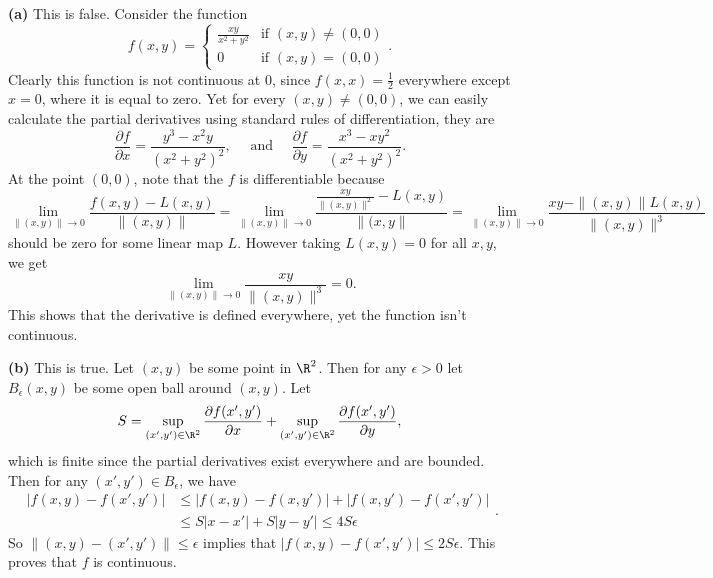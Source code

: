 \documentclass[11pt,letterpaper]{article}
\begin{document}
\begin{solution}
    \textbf{(a)} This is false. Consider the function
    \[
        f(x,y) = \begin{cases}
            \displaystyle\frac{xy}{x^2+y^2}&\textrm{if }(x,y)\neq (0,0)\\
            0&\textrm{if }(x,y)=(0,0)
        \end{cases}
    .\] 
    Clearly this function is not continuous at $0$, since $f(x,x)=\frac{1}{2}$ everywhere except $x=0$, where it is equal to zero. Yet for every $(x,y)\neq (0,0)$, we can easily calculate the partial derivatives using standard rules of differentiation, they are
    \[
        \frac{\partial f}{\partial x} = \frac{y^3-x^2y}{(x^2+y^2)^2},\quad\textrm{ and }\quad \frac{\partial f}{\partial y}=\frac{x^3-xy^2}{(x^2+y^2)^2}
    .\]
    At the point $(0,0)$, note that the $f$ is differentiable because 
    \[
        \lim_{\|(x,y)\|\to 0}\frac{f(x,y)-L(x,y)}{\|(x,y)\|}=\lim_{\|(x,y)\|\to 0}\frac{\displaystyle\frac{xy}{\|(x,y)\|^2}-L(x,y)}{\|(x,y\|}=\lim_{\|(x,y)\|\to 0}\frac{xy-\|(x,y)\|L(x,y)}{\|(x,y)\|^3}
    \]
    should be zero for some linear map $L$. However taking $L(x,y)=0$ for all $x,y$, we get
    \[
        \lim_{\|(x,y)\|\to 0} \frac{xy}{\|(x,y)\|^3}=0
    .\] 
    This shows that the derivative is defined everywhere, yet the function isn't continuous.
    
    \textbf{(b)} This is true. Let $(x,y)$ be some point in $\R^2$. Then for any $\epsilon>0$ let $B_\epsilon(x,y)$ be some open ball around $(x,y)$. Let \[S=\sup_{(x',y')\in \R^2}\frac{\partial f(x',y')}{\partial x}+\sup_{(x',y')\in \R^2}\frac{\partial f(x',y')}{\partial y},\]
    which is finite since the partial derivatives exist everywhere and are bounded. Then for any $(x',y')\in B_\epsilon$, we have
    \[
        \begin{aligned}
        |f(x,y)-f(x',y')|&\leq |f(x,y)-f(x,y')| + |f(x,y')-f(x',y')|\\
        & \leq S|x-x'| + S|y-y'| \leq 4S\epsilon
        \end{aligned}
    .\]  
    So $\|(x,y)-(x',y')\|\leq \epsilon$ implies that $|f(x,y)-f(x',y')|\leq 2S\epsilon$. This proves that $f$ is continuous.
    

\end{solution}
\end{document}
